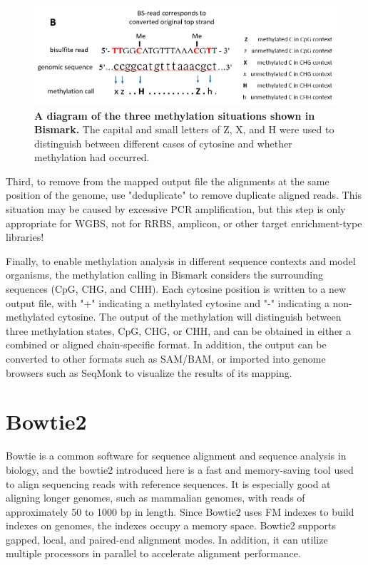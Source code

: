 \documentclass{PHlab-thesis}
\begin{document}
\begin{figure}[h!]
  \centering
  \includegraphics[scale=0.8]{figures/bismark-b.png}
  \caption{\textbf{A diagram of the three methylation situations shown in Bismark.}
  The capital and small letters of Z, X, and H were used to distinguish between different cases of cytosine and whether methylation had occurred.}
  \label{f4}
\end{figure}


\par
Third, to remove from the mapped output file the alignments at the same position of the genome, use "deduplicate" to remove duplicate aligned reads. This situation may be caused by excessive PCR amplification, but this step is only appropriate for WGBS, not for RRBS, amplicon, or other target enrichment-type libraries!

\par
Finally, to enable methylation analysis in different sequence contexts and model organisms, the methylation calling in Bismark considers the surrounding sequences (CpG, CHG, and CHH). Each cytosine position is written to a new output file, with "+" indicating a methylated cytosine and "-" indicating a non-methylated cytosine. The output of the methylation will distinguish between three methylation states, CpG, CHG, or CHH, and can be obtained in either a combined or aligned chain-specific format. In addition, the output can be converted to other formats such as SAM/BAM, or imported into genome browsers such as SeqMonk to visualize the results of its mapping.

\section{Bowtie2}
Bowtie is a common software for sequence alignment and sequence analysis in biology, and the bowtie2 introduced here is a fast and memory-saving tool used to align sequencing reads with reference sequences\cite{langmead2012fast}. It is especially good at aligning longer genomes, such as mammalian genomes, with reads of approximately 50 to 1000 bp in length. Since Bowtie2 uses FM indexes to build indexes on genomes, the indexes occupy a memory space. Bowtie2 supports gapped, local, and paired-end alignment modes. In addition, it can utilize multiple processors in parallel to accelerate alignment performance.
\end{document}
